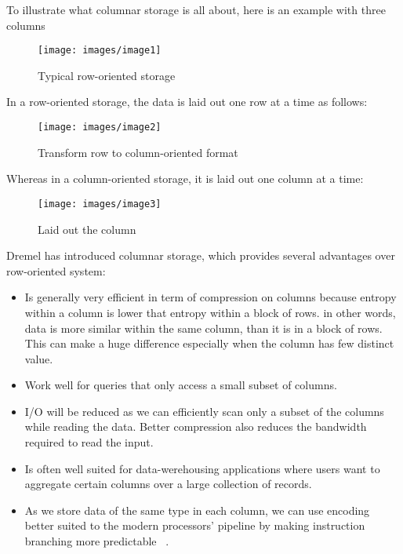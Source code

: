 \documentclass[9pt,twocolumn,twoside]{styles/osajnl}
\begin{document}
To illustrate what columnar storage is all about, here is an example with three columns


\begin{figure}[H]
 \centering
\texttt{[image: images/image1]}
\caption{Typical row-oriented storage}
\end{figure}



In a row-oriented storage, the data is laid out one row at a time as follows:


\begin{figure}[H]
 \centering
\texttt{[image: images/image2]}
\caption{Transform row to column-oriented format}
\end{figure}

Whereas in a column-oriented storage, it is laid out one column at a time:

\begin{figure}[H]
 \centering
\texttt{[image: images/image3]}
\caption{Laid out the column}
\end{figure}

Dremel has introduced columnar storage, which  provides several advantages over row-oriented system:

\begin{itemize}
  \item Is generally very efficient in term of compression on columns because entropy within a column is lower that entropy within a block of rows. in other words, data is more similar within the same column, than it is in a block of rows. This can make a huge difference especially when the column has few distinct value.
  \item Work well for queries that only access a small subset of columns. 
  \item I/O will be reduced as we can efficiently scan only a subset of the columns while reading the data. Better compression also reduces the bandwidth required to read the input.
  \item Is often well suited for data-werehousing applications where users want to aggregate certain columns over a large collection of records. 
  \item As we store data of the same type in each column, we can use encoding better suited to the modern processors’ pipeline by making instruction branching more predictable ~\cite{book-hadoop-apps}.
\end{itemize}
\end{document}
